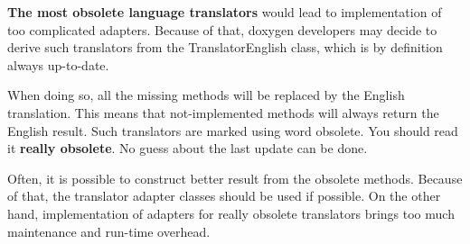 {\bfseries The most obsolete language translators} would lead to implementation of too complicated adapters. Because of that, doxygen developers may decide to derive such translators from the {\ttfamily TranslatorEnglish} class, which is by definition always up-\/to-\/date.

When doing so, all the missing methods will be replaced by the English translation. This means that not-\/implemented methods will always return the English result. Such translators are marked using word {\ttfamily obsolete}. You should read it {\bfseries really obsolete}. No guess about the last update can be done.

Often, it is possible to construct better result from the obsolete methods. Because of that, the translator adapter classes should be used if possible. On the other hand, implementation of adapters for really obsolete translators brings too much maintenance and run-\/time overhead. 